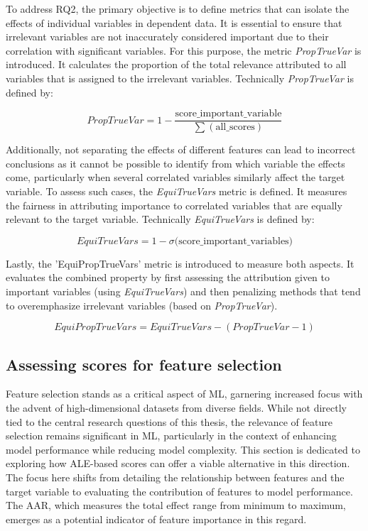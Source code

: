 To address RQ2, the primary objective is to define metrics that can isolate the effects of individual variables in dependent data. It is essential to ensure that irrelevant variables are not inaccurately considered important due to their correlation with significant variables. For this purpose, the metric \textit{PropTrueVar} is introduced. It calculates the proportion of the total relevance attributed to all variables that is assigned to the irrelevant variables. Technically \textit{PropTrueVar} is defined by:


\begin{equation}
\label{eq:lm+inter}
PropTrueVar = 1 - \frac{\text{score\_important\_variable}}{\sum(\text{all\_scores})}
\end{equation}


Additionally, not separating the effects of different features can lead to incorrect conclusions as it cannot be possible to identify from which variable the effects come, particularly when several correlated variables similarly affect the target variable. To assess such cases, the \textit{EquiTrueVars} metric is defined. It measures the fairness in attributing importance to correlated variables that are equally relevant to the target variable. Technically \textit{EquiTrueVars} is defined by:

\begin{equation}
\label{eq:lm+inter}
EquiTrueVars = 1 - \sigma(\text{score\_important\_variables)}
\end{equation}


Lastly, the 'EquiPropTrueVars' metric is introduced to measure both aspects. It evaluates the combined property by first assessing the attribution given to important variables (using \textit{EquiTrueVars}) and then penalizing methods that tend to overemphasize irrelevant variables (based on \textit{PropTrueVar}).

\begin{equation}
\label{eq:lm+inter}
EquiPropTrueVars = EquiTrueVars - (PropTrueVar -1)
\end{equation}


\subsection{Assessing scores for feature selection}

Feature selection stands as a critical aspect of \gls{ML}, garnering increased focus with the advent of high-dimensional datasets from diverse fields. While not directly tied to the central research questions of this thesis, the relevance of feature selection remains significant in \gls{ML}, particularly in the context of enhancing model performance while reducing model complexity. This section is dedicated to exploring how \gls{ALE}-based scores can offer a viable alternative in this direction. The focus here shifts from detailing the relationship between features and the target variable to evaluating the contribution of features to model performance. The \gls{AAR}, which measures the total effect range from minimum to maximum, emerges as a potential indicator of feature importance in this regard.

